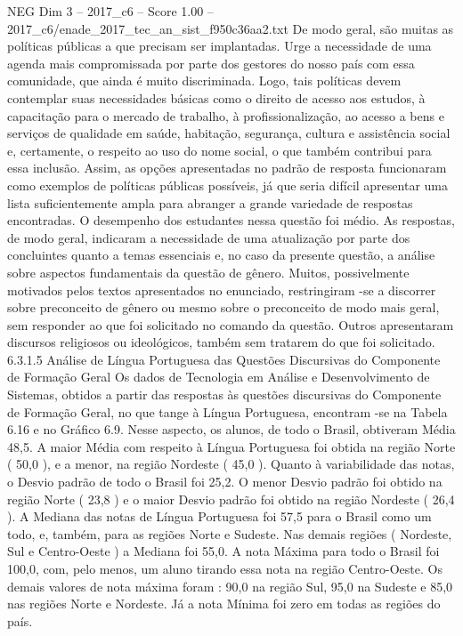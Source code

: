 \begin{textsample}{NEG Dim 3 – 2017\_c6 – Score 1.00 – 2017\_c6/enade\_2017\_tec\_an\_sist\_f950c36aa2.txt}
De modo geral, são muitas as políticas públicas a que precisam ser implantadas.
Urge a necessidade de uma agenda mais compromissada por parte dos gestores do nosso país com essa comunidade, que ainda é muito discriminada.
Logo, tais políticas devem contemplar suas necessidades básicas como o direito de acesso aos estudos, à capacitação para o mercado de trabalho, à profissionalização, ao acesso a bens e serviços de qualidade em saúde, habitação, segurança, cultura e assistência social e, certamente, o respeito ao uso do nome social, o que também contribui para essa inclusão.
Assim, as opções apresentadas no padrão de resposta funcionaram como exemplos de políticas públicas possíveis, já que seria difícil apresentar uma lista suficientemente ampla para abranger a grande variedade de respostas encontradas.
O desempenho dos estudantes nessa questão foi médio.
As respostas, de modo geral, indicaram a necessidade de uma atualização por parte dos concluintes quanto a temas essenciais e, no caso da presente questão, a análise sobre aspectos fundamentais da questão de gênero.
Muitos, possivelmente motivados pelos textos apresentados no enunciado, restringiram -se a discorrer sobre preconceito de gênero ou mesmo sobre o preconceito de modo mais geral, sem responder ao que foi solicitado no comando da questão.
Outros apresentaram discursos religiosos ou ideológicos, também sem tratarem do que foi solicitado. 6.3.1.5 Análise de Língua Portuguesa das Questões Discursivas do Componente de Formação Geral Os dados de Tecnologia em Análise e Desenvolvimento de Sistemas, obtidos a partir das respostas às questões discursivas do Componente de Formação Geral, no que tange à Língua Portuguesa, encontram -se na Tabela 6.16 e no Gráfico 6.9.
Nesse aspecto, os alunos, de todo o Brasil, obtiveram Média 48,5.
A maior Média com respeito à Língua Portuguesa foi obtida na região Norte ( 50,0 ), e a menor, na região Nordeste ( 45,0 ).
Quanto à variabilidade das notas, o Desvio padrão de todo o Brasil foi 25,2.
O menor Desvio padrão foi obtido na região Norte ( 23,8 ) e o maior Desvio padrão foi obtido na região Nordeste ( 26,4 ).
A Mediana das notas de Língua Portuguesa foi 57,5 para o Brasil como um todo, e, também, para as regiões Norte e Sudeste.
Nas demais regiões ( Nordeste, Sul e Centro-Oeste ) a Mediana foi 55,0.
A nota Máxima para todo o Brasil foi 100,0, com, pelo menos, um aluno tirando essa nota na região Centro-Oeste.
Os demais valores de nota máxima foram : 90,0 na região Sul, 95,0 na Sudeste e 85,0 nas regiões Norte e Nordeste.
Já a nota Mínima foi zero em todas as regiões do país.

\end{textsample}
